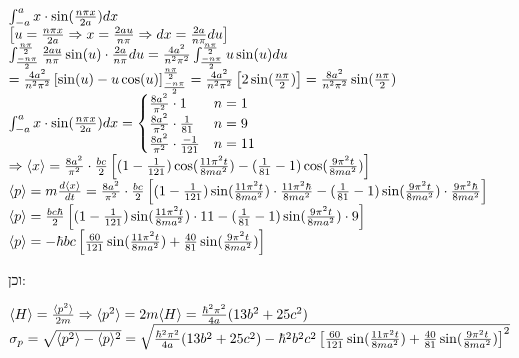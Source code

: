 \documentclass[14pt]{extarticle}
\makeatletter
\newenvironment{lefteqs}{%
    \begin{english}%
    \begin{flushleft}%
    \renewcommand{\arraystretch}{1.3}%
    $\begin{array}{@{}l@{}}%
}{%
    \end{array}$%
    \end{flushleft}%
    \end{english}%
}
\makeatother
\begin{document}
\begin{lefteqs}
    \int_{-a}^{a} x \cdot \sin(\frac{n\pi x}{2a}) dx \\
    \left[ u = \frac{n\pi x}{2a} \Rightarrow x=\frac{2au}{n\pi} \Rightarrow dx = \frac{2a}{n\pi} du \right] \\
    \int_{\frac{-n\pi}{2}}^{\frac{n\pi}{2}} \frac{2au}{n\pi} \sin(u) \cdot \frac{2a}{n\pi} du = \frac{4a^2}{n^2 \pi^2} \int_{\frac{-n\pi}{2}}^{\frac{n\pi}{2}} u \sin(u) du \\
    = \frac{4a^2}{n^2 \pi^2} \left[ \sin(u) - u\cos(u) \right]_{\frac{-n\pi}{2}}^{\frac{n\pi}{2}} = \frac{4a^2}{n^2 \pi^2} \left[ 2\sin(\frac{n\pi}{2}) \right] = \frac{8a^2}{n^2 \pi^2} \sin(\frac{n\pi}{2}) \\

    \int_{-a}^{a} x \cdot \sin(\frac{n\pi x}{2a}) dx = \begin{cases}
        \frac{8a^2}{\pi^2} \cdot 1              & n=1  \\
        \frac{8a^2}{\pi^2} \cdot \frac{1}{81}   & n=9  \\
        \frac{8a^2}{\pi^2} \cdot \frac{-1}{121} & n=11 \\
    \end{cases} \\

    \Rightarrow \langle x \rangle = \frac{8a^2}{\pi^2} \cdot \frac{bc}{2} \left[ (1-\frac{1}{121})\cos(\frac{11\pi^2 t}{8ma^2}) -(\frac{1}{81} - 1)\cos(\frac{9\pi^2 t}{8ma^2}) \right] \\
    \langle p \rangle = m \frac{d \langle x \rangle}{dt} = \frac{8a^2}{\pi^2} \cdot \frac{bc}{2} \left[ (1-\frac{1}{121})\sin(\frac{11\pi^2 t}{8ma^2}) \cdot \frac{11\pi^2 \hbar}{8ma^2} -(\frac{1}{81} - 1)\sin(\frac{9\pi^2 t}{8ma^2}) \cdot \frac{9\pi^2 \hbar}{8ma^2} \right] \\
    \langle p \rangle = \frac{bc\hbar}{2} \left[ (1-\frac{1}{121})\sin(\frac{11\pi^2 t}{8ma^2}) \cdot 11 -(\frac{1}{81} - 1)\sin(\frac{9\pi^2 t}{8ma^2}) \cdot 9 \right] \\
    \langle p \rangle = -\hbar bc \left[ \frac{60}{121}\sin(\frac{11\pi^2 t}{8ma^2}) + \frac{40}{81}\sin(\frac{9\pi^2 t}{8ma^2}) \right] \\
\end{lefteqs}

וכן:

\begin{lefteqs}
    \langle H \rangle = \frac{\langle p^2 \rangle}{2m} \Rightarrow \langle p^2 \rangle = 2m \langle H \rangle = \frac{\hbar^2 \pi^2}{4a} (13 b^2 + 25 c^2) \\
    \sigma_p = \sqrt{\langle p^2 \rangle - \langle p \rangle^2} = \sqrt{\frac{\hbar^2 \pi^2}{4a} (13 b^2 + 25 c^2) - \hbar^2 b^2 c^2 \left[ \frac{60}{121}\sin(\frac{11\pi^2 t}{8ma^2}) + \frac{40}{81}\sin(\frac{9\pi^2 t}{8ma^2}) \right]^2}
\end{lefteqs}
\end{document}
